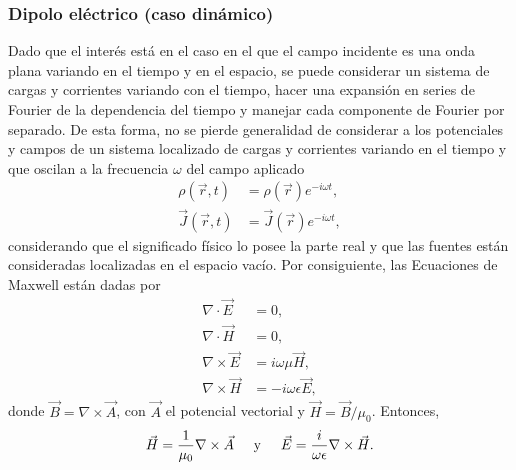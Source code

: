 \subsubsection{Dipolo eléctrico (caso dinámico)}
Dado que el interés está en el caso en el que el campo incidente es una onda plana variando en el tiempo y en el espacio, se puede considerar un sistema de cargas y corrientes variando con el tiempo, hacer una expansión en series de Fourier de la dependencia del tiempo y manejar cada componente de Fourier por separado. De esta forma, no se pierde generalidad de considerar a los potenciales y campos de un sistema localizado de cargas y corrientes variando en el tiempo y que oscilan a la frecuencia $\omega$ del campo aplicado \cite{Jackson}
\begin{align}
    \rho(\Vec{r},t)&=\rho(\Vec{r})e^{-i\omega t},\nonumber\\
    \Vec{J}(\Vec{r},t)&=\Vec{J}(\Vec{r})e^{-i\omega t},
    \label{armonicf}
\end{align}
considerando que el significado físico lo posee la parte real y que las fuentes están consideradas localizadas en el espacio vacío. Por consiguiente, las Ecuaciones de Maxwell están dadas por
\begin{align}
	\nabla\cdot\Vec{E}&=0,\\
	\nabla\cdot\Vec{H}&=0,\\
	\nabla\times\Vec{E}&=i\omega\mu\Vec{H},\\
	\nabla\times\Vec{H}&=-i\omega\epsilon\Vec{E},
\end{align}
donde $\Vec{B}=\nabla\times\Vec{A}$, con $\Vec{A}$ el potencial vectorial y $ \Vec{H}=\Vec{B}/\mu_0$. Entonces,
\begin{equation}
	\Vec{H}=\frac{1}{\mu_0}\nabla\times\Vec{A}\hspace{0.5cm}\mbox{y}\hspace{0.5cm}    \Vec{E}=\frac{i}{\omega\epsilon}\nabla\times\Vec{H}.
\end{equation}

